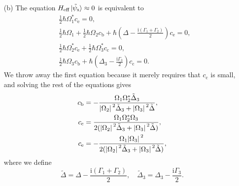 \documentclass[hyperref, a4paper]{article}
\newcommand*{\ii}{\mathrm{i}}
\begin{document}
\begin{itemize}
\item[(b)] The equation $H_\text{eff} \ket*{\tilde{\psi}_\text{s}} \approx 0$ is equivalent to 
\[
    \begin{aligned}
        & \frac{1}{2} \hbar \Omega_1^* c_\text{e} = 0, \\
        & \frac{1}{2} \hbar \Omega_1 + \frac{1}{2} \hbar \Omega_2 c_\text{b} + \hbar \left( \Delta - \frac{\ii (\Gamma_1 + \Gamma_2)}{2} \right) c_\text{e} = 0, \\
        & \frac{1}{2} \hbar \Omega_2^* c_\text{e} + \frac{1}{2} \hbar \Omega_3^* c_\text{c} = 0, \\
        & \frac{1}{2} \hbar \Omega_3 c_\text{b} + \hbar \left( \Delta_3 - \frac{\ii \Gamma_3}{2} \right) c_\text{c} = 0.
    \end{aligned}
\] 
We throw away the first equation because it merely requires that $c_\text{c}$ is small, and solving the rest 
of the equations gives 
\begin{equation}
    \begin{aligned}
        c_\text{b} &= - \frac{\Omega_1 \Omega_2^* \tilde{\Delta}_3 }{ \abs*{\Omega_2}^2 \tilde{\Delta}_3 + \abs*{\Omega_3}^2 \tilde{\Delta}}, \\
        c_\text{c} &= \frac{\Omega_1 \Omega_2^* \Omega_3}{2 (\abs*{\Omega_2}^2 \tilde{\Delta}_3 + \abs*{\Omega_3}^2 \tilde{\Delta}) } , \\
        c_\text{e} &= - \frac{\Omega_1 \abs*{\Omega_3}^2}{2 (\abs*{\Omega_2}^2 \tilde{\Delta}_3 + \abs*{\Omega_3}^2 \tilde{\Delta}) },
    \end{aligned}
\end{equation}
where we define 
\begin{equation}
    \tilde{\Delta} = \Delta - \frac{\ii (\Gamma_1 + \Gamma_2)}{2}, \quad \tilde{\Delta}_3 = \Delta_3 - \frac{\ii \Gamma_3}{2}.
\end{equation}


\end{itemize}
\end{document}
